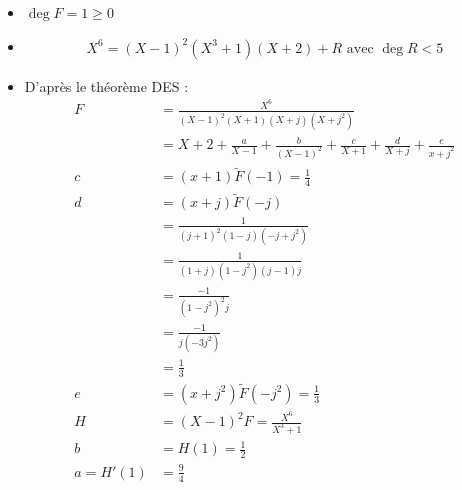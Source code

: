 \documentclass[../main.tex]{subfiles}
\begin{document}
\begin{itemize}
    \item $\deg F = 1 \geq 0$
    \item \begin{align*}
        X^6 = (X-1)^2(X^3 + 1)(X + 2) + R \text{ avec } \deg R < 5
    \end{align*}
    \item D'après le théorème DES : 
    \begin{align*}
        F &= \frac{X^6}{(X - 1)^2(X + 1)(X + j)(X + j^2)} \\
        &= X + 2 + \frac{a}{X - 1} + \frac{b}{(X - 1)^2} + \frac{c}{X + 1} + \frac{d}{X + j} + \frac{e}{x + j^2} \\
        c &= (x+1)\tilde F (-1) = \frac{1}{4} \\
        d &= (x+j)\tilde F (-j) \\
        &= \frac{1}{(j+1)^2(1-j)(-j+j^2)} \\
        &= \frac{1}{(1+j)(1-j^2)(j-1)j} \\
        &= \frac{-1}{(1-j^2)^2j} \\
        &= \frac{-1}{j(-3j^2)} \\
        &= \frac{1}{3} \\
        e &= (x+j^2)\tilde F (-j^2) = \frac{1}{3} \\
        H &= (X-1)^2 F = \frac{X^6}{X^3 + 1} \\
        b &= H(1) = \frac{1}{2} \\
        a = H'(1) &= \frac{9}{4}
    \end{align*}
\end{itemize}
\end{document}
